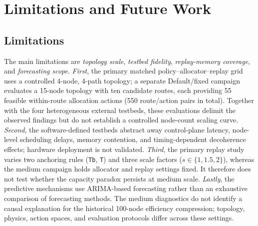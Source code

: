 \section{Limitations and Future Work}
\label{sec:limitations_future_work}

\subsection{Limitations}
The main limitations are \textit{topology scale}, \textit{testbed fidelity}, \textit{replay-memory coverage}, and \textit{forecasting scope}. \textit{First}, the primary matched policy--allocator--replay grid uses a controlled 4-node, 4-path topology; a separate Default/fixed campaign evaluates a 15-node topology with ten candidate routes, each providing 55 feasible within-route allocation actions (550 route/action pairs in total). Together with the four heterogeneous external testbeds, these evaluations delimit the observed findings but do not establish a controlled node-count scaling curve. \textit{Second}, the software-defined testbeds abstract away control-plane latency, node-level scheduling delays, memory contention, and timing-dependent decoherence effects; hardware deployment is not validated. \textit{Third}, the primary replay study varies two anchoring rules (\texttt{Tb}, \texttt{T}) and three scale factors ($s\in\{1,1.5,2\}$), whereas the medium campaign holds allocator and replay settings fixed. It therefore does not test whether the capacity paradox persists at medium scale. \textit{Lastly}, the predictive mechanisms use ARIMA-based forecasting rather than an exhaustive comparison of forecasting methods. The medium diagnostics do not identify a causal explanation for the historical 100-node efficiency compression; topology, physics, action spaces, and evaluation protocols differ across these settings.



